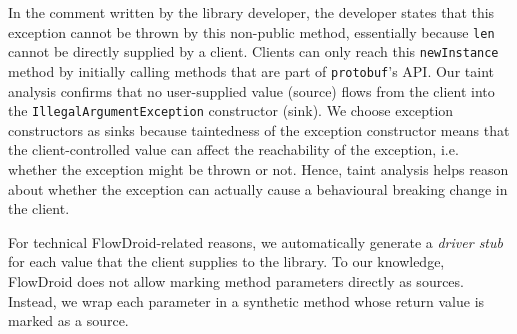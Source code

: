 In the comment written by the library developer, the developer states that this exception cannot be thrown by this non-public method, essentially because \texttt{len} cannot be directly supplied by a client. Clients can only reach this \texttt{newInstance} method by initially calling methods that are part of \texttt{protobuf}'s API. Our taint analysis confirms that no user-supplied value (source) flows from the client into the \texttt{IllegalArgumentException} constructor (sink). We choose exception constructors as sinks because taintedness of the exception constructor means that the client-controlled value can affect the reachability of the exception, i.e. whether the exception might be thrown or not. Hence, taint analysis helps reason about whether the exception can actually cause a behavioural breaking change in the client.

For technical FlowDroid-related reasons, we automatically generate a \textit{driver stub} for each value that the client supplies to the library. To our knowledge, FlowDroid does not allow marking method parameters directly as sources. Instead, we wrap each parameter in a synthetic method whose return value is marked as a source.



